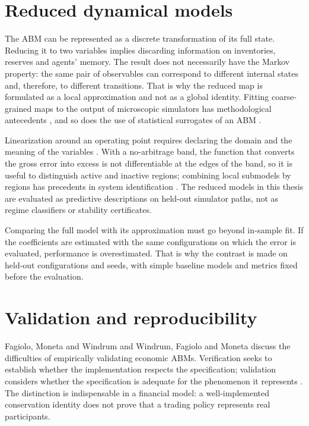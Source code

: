 \section{Reduced dynamical models}

The ABM can be represented as a discrete transformation of its full state. Reducing it to two variables implies discarding information on inventories, reserves and agents' memory. The result does not necessarily have the Markov property: the same pair of observables can correspond to different internal states and, therefore, to different transitions. That is why the reduced map is formulated as a local approximation and not as a global identity. Fitting coarse-grained maps to the output of microscopic simulators has methodological antecedents \cite{gear2003equationfree}, and so does the use of statistical surrogates of an ABM \cite{lamperti2018surrogates}.

Linearization around an operating point requires declaring the domain and the meaning of the variables \cite{roubal2010linearization}. With a no-arbitrage band, the function that converts the gross error into excess is not differentiable at the edges of the band, so it is useful to distinguish active and inactive regions; combining local submodels by regions has precedents in system identification \cite{takagi1985fuzzy}. The reduced models in this thesis are evaluated as predictive descriptions on held-out simulator paths, not as regime classifiers or stability certificates.

Comparing the full model with its approximation must go beyond in-sample fit. If the coefficients are estimated with the same configurations on which the error is evaluated, performance is overestimated. That is why the contrast is made on held-out configurations and seeds, with simple baseline models and metrics fixed before the evaluation.

\section{Validation and reproducibility}

Fagiolo, Moneta and Windrum \cite{fagiolo2007critical} and Windrum, Fagiolo and Moneta \cite{windrum2007empirical} discuss the difficulties of empirically validating economic ABMs. Verification seeks to establish whether the implementation respects the specification; validation considers whether the specification is adequate for the phenomenon it represents \cite{sargent2013verification}. The distinction is indispensable in a financial model: a well-implemented conservation identity does not prove that a trading policy represents real participants.

